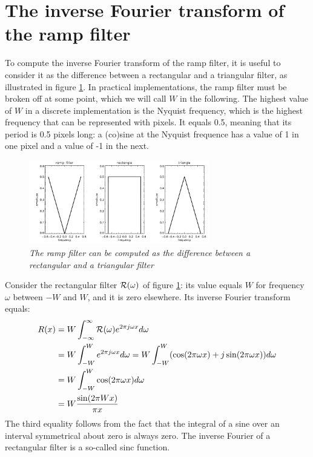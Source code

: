 \documentclass[11pt,oneside]{book}
\begin{document}
\newpage
\section{The inverse Fourier transform of the ramp filter} \label{app:ramp}
To compute the inverse Fourier transform of the ramp filter, it is
useful to consider it as the difference between a rectangular and a
triangular filter, as illustrated in figure \ref{fig:rampapp2}. In
practical implementations, the ramp filter must be broken off at some
point, which we will call $W$ in the following. The highest value of
$W$ in a discrete implementation is the Nyquist frequency, which is
the highest frequency that can be represented with pixels. It equals
0.5, meaning that its period is 0.5 pixels long: a (co)sine at the
Nyquist frequence has a value of 1 in one pixel and a value of -1 in
the next.

\begin{figure}[tbh]
\centering
\includegraphics[width=0.7\textwidth]{figs/fig_rampfilter2_app.pdf}
\caption{\label{fig:rampapp2} \emph{The ramp filter can be computed as
    the difference between a rectangular and a triangular filter}}
\end{figure}

Consider the rectangular filter ${\cal R}(\omega)$ of figure  \ref{fig:rampapp2}: its
value equals $W$ for frequency $\omega$ between $-W$ and $W$, and it is
zero elsewhere. Its inverse Fourier transform equals:
\begin{align}
R(x) & =  W \int_{-\infty}^{\infty} {\cal R}(\omega) e^{2\pi j \omega x} 
           d\omega \nonumber \\
 &= W \int_{-W}^W e^{2\pi j \omega x} d\omega = W \int_{-W}^W (\cos(2\pi \omega x) + j \sin(2\pi \omega x)) d\omega 
       \nonumber \\
 &= W \int_{-W}^W \cos(2\pi \omega x) d\omega \nonumber \\
 & = W \frac{\sin(2\pi W x)}{\pi x} 
\end{align}
The third equality follows from the fact that the integral of a sine
over an interval symmetrical about zero is always zero. The inverse
Fourier of a rectangular filter is a so-called sinc function.
\end{document}
